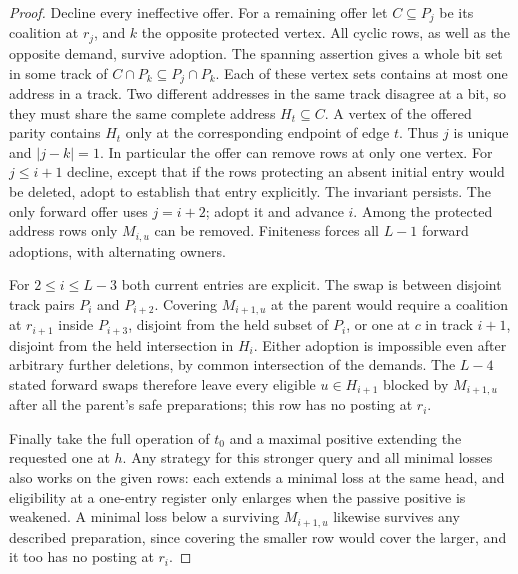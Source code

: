 \begin{proof}
Decline every ineffective offer. For a remaining offer let $C\subseteq P_j$
be its coalition at $r_j$, and $k$ the opposite protected vertex.
All cyclic rows, as well as the opposite demand, survive adoption.
The spanning assertion gives a whole bit set in some track of
$C\cap P_k\subseteq P_j\cap P_k$. Each of these vertex sets contains
at most one address in a track. Two different addresses in the same
track disagree at a bit, so they must share the same complete address
$H_t\subseteq C$. A vertex of the offered parity contains $H_t$ only
at the corresponding endpoint of edge $t$. Thus $j$ is unique and
$|j-k|=1$. In particular the offer can remove rows at only one vertex.
For $j\le i+1$ decline, except that if the rows protecting an absent
initial entry would be deleted, adopt to establish that entry explicitly.
The invariant persists. The only forward offer uses $j=i+2$; adopt it
and advance $i$. Among the protected address rows only $M_{i,u}$ can
be removed. Finiteness forces all $L-1$ forward adoptions, with
alternating owners.

For $2\le i\le L-3$ both current entries are explicit. The swap
is between disjoint track pairs $P_i$ and $P_{i+2}$. Covering $M_{i+1,u}$ at the parent would require a
coalition at $r_{i+1}$ inside $P_{i+3}$, disjoint from the held
subset of $P_i$, or one at $c$ in track $i+1$, disjoint from the
held intersection in $H_i$. Either adoption is impossible even
after arbitrary further deletions, by common intersection of the
demands. The $L-4$ stated forward swaps therefore leave every
eligible $u\in H_{i+1}$ blocked by $M_{i+1,u}$ after all the
parent's safe preparations; this row has no posting at $r_i$.

Finally take the full operation of $t_0$ and a maximal positive
extending the requested one at $h$. Any strategy for this stronger
query and all minimal losses also works on the given rows: each
extends a minimal loss at the same head, and eligibility at a
one-entry register only enlarges when the passive positive is
weakened. A minimal loss below a surviving $M_{i+1,u}$ likewise
survives any described preparation, since covering the smaller row
would cover the larger, and it too has no posting at $r_i$.
\end{proof}
